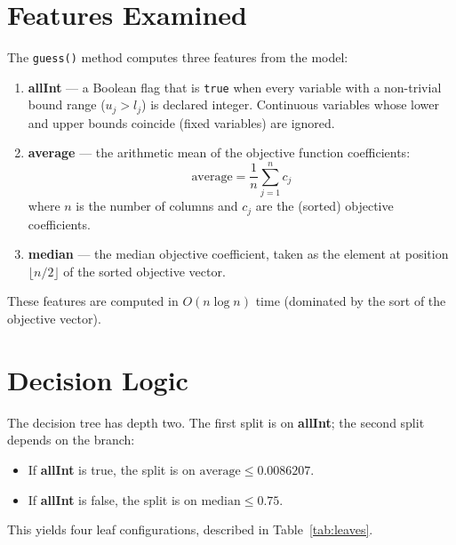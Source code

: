 \documentclass[11pt,a4paper]{article}
\begin{document}
\section{Features Examined}

The \texttt{guess()} method computes three features from the model:

\begin{enumerate}
  \item \textbf{allInt} --- a Boolean flag that is \texttt{true} when every
        variable with a non-trivial bound range
        ($u_j > l_j$) is declared integer.  Continuous variables whose lower
        and upper bounds coincide (fixed variables) are ignored.
  \item \textbf{average} --- the arithmetic mean of the objective function
        coefficients:
        \[
          \text{average} = \frac{1}{n}\sum_{j=1}^{n} c_j
        \]
        where $n$ is the number of columns and $c_j$ are the (sorted)
        objective coefficients.
  \item \textbf{median} --- the median objective coefficient, taken as the
        element at position $\lfloor n/2 \rfloor$ of the sorted objective
        vector.
\end{enumerate}

These features are computed in $O(n \log n)$ time (dominated by the sort of
the objective vector).

\section{Decision Logic}

The decision tree has depth two.  The first split is on \textbf{allInt}; the
second split depends on the branch:

\begin{itemize}
  \item If \textbf{allInt} is true, the split is on
        $\text{average} \leq 0.0086207$.
  \item If \textbf{allInt} is false, the split is on
        $\text{median} \leq 0.75$.
\end{itemize}

This yields four leaf configurations, described in
Table~\ref{tab:leaves}.
\end{document}
